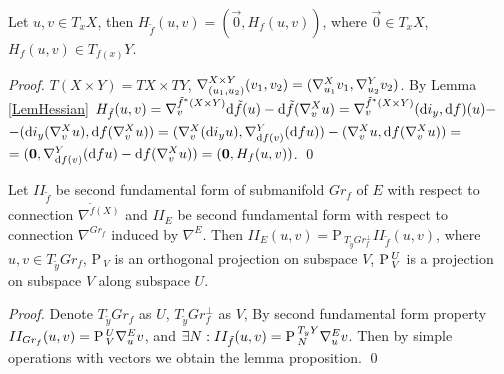 \documentclass{llncs}
\newcommand{\Proj}{\mathrm{P}{\,}}
\newcommand{\ProjNonOrth}[2]{\tensor*{\Proj}{^{#1}_{#2}}}
\newcommand{\CovariantDiffManif}[1]{\nabla^{#1}}
\newcommand{\CovariantDerivManif}[2]{\tensor*{\nabla}{^{#1}_{#2}}}
\newcommand{\Diff}{\mathrm{d}}
\newcommand {\Preimage}[2]{{#2}^*{#1}}
\begin{document}
\begin{lemma} \label{LemBigSmallHess}
Let $u, v \in T_xX$, 
then $H_{\tilde{f}}(u, v) = (\vec{0}, H_f(u, v))$,
where $\vec{0} \in T_xX$,
\\$H_f(u, v) \in T_{f(x)}Y$.
\end{lemma}

\begin{proof}
$T(X\times Y)=TX\times TY$, $\CovariantDerivManif{X\times Y}{(u_1, u_2)}{(v_1, v_2)} = (\CovariantDerivManif{X}{u_1}{v_1}, \CovariantDerivManif{Y}{u_2}{v_2})$. 
By Lemma \ref{LemHessian} 
$H_{\tilde{f}}(u, v)=
\CovariantDerivManif{\Preimage{(X \times Y)}{\tilde{f}}} {v} \Diff \tilde{f}(u) - 
							\Diff \tilde{f}( 
							\CovariantDerivManif{X}{v}u
							) =
							\CovariantDerivManif{\Preimage{(X \times Y)}{\tilde{f}}}{v} (\Diff i_y, \Diff f)(u) - $
							\\
							$ - (\Diff i_y( 
							\CovariantDerivManif{X}{v}u
							), \Diff f( 
							\CovariantDerivManif{X}{v}u
							)) =
							(\CovariantDerivManif{X}{v} (\Diff i_y u), \CovariantDerivManif{Y}{\Diff f(v)} (\Diff f u)) - 
							(\CovariantDerivManif{X}{v}u, \Diff f( 
							\CovariantDerivManif{X}{v}u)
							) =$
							\\
							$=(\vec{0}, \CovariantDerivManif{Y}{\Diff f(v)} (\Diff f u) - \Diff f( 
							\CovariantDerivManif{X}{v}u)) =
							(\vec{0}, H_f(u, v))$.
\qed 
\end{proof}

\begin{lemma} \label{LemProj}
Let $II_{\tilde{f}}$ be second fundamental form of submanifold $Gr_f$ of $E$ with respect to connection $\CovariantDiffManif{\tilde{f}(X)}$ and $II_E$ be second fundamental form with respect to connection $\CovariantDiffManif{Gr_f}$ induced by $\CovariantDiffManif{E}$. Then $II_E(u, v) = \Proj_{T_{\tilde{y}}Gr_f^{\bot}} II_{\tilde{f}}(u, v)$, where $u, v \in T_{\tilde{y}}Gr_f$, $\Proj_V$ is an orthogonal projection on subspace $V$, $\ProjNonOrth{U}{V}$ is a projection on subspace $V$ along subspace $U$.
\end{lemma}

\begin{proof}
Denote $T_{\tilde{y}}Gr_f$ as $U$, $T_{\tilde{y}}Gr_f^{\bot}$ as $V$, 
By second fundamental form property $II_{Gr_f}(u, v) = \ProjNonOrth{U}{V}\CovariantDerivManif{E}{u}v$, and $\exists N: 
II_{\tilde{f}}(u, v) = \ProjNonOrth{T_yY}{N}\CovariantDerivManif{E}{u}v$. Then by simple operations with vectors we obtain the lemma proposition.
\qed
\end{proof}
\end{document}
